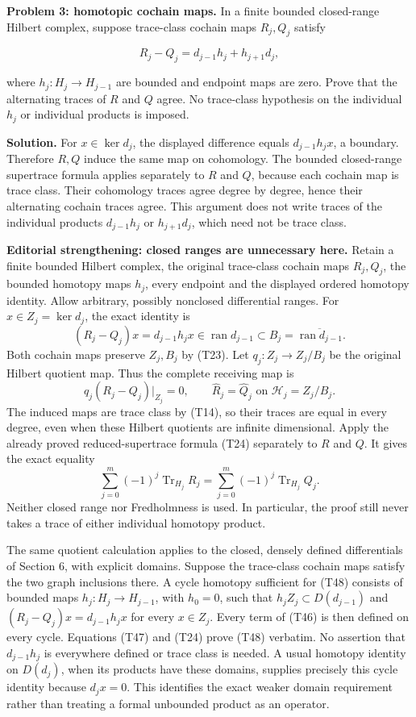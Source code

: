 \documentclass[
  11pt,
]{article}
\begin{document}
\textbf{Problem 3: homotopic cochain maps.} In a finite bounded
closed-range Hilbert complex, suppose trace-class cochain maps
\(R_j,Q_j\) satisfy

\[
R_j-Q_j=d_{j-1}h_j+h_{j+1}d_j,
\]

where \(h_j:H_j\to H_{j-1}\) are bounded and endpoint maps are zero.
Prove that the alternating traces of \(R\) and \(Q\) agree. No
trace-class hypothesis on the individual \(h_j\) or individual products
is imposed.

\textbf{Solution.} For \(x\in\ker d_j\), the displayed difference equals
\(d_{j-1}h_jx\), a boundary. Therefore \(R,Q\) induce the same map on
cohomology. The bounded closed-range supertrace formula applies
separately to \(R\) and \(Q\), because each cochain map is trace class.
Their cohomology traces agree degree by degree, hence their alternating
cochain traces agree. This argument does not write traces of the
individual products \(d_{j-1}h_j\) or \(h_{j+1}d_j\), which need not be
trace class.

\textbf{Editorial strengthening: closed ranges are unnecessary here.}
Retain a finite bounded Hilbert complex, the original trace-class
cochain maps \(R_j,Q_j\), the bounded homotopy maps \(h_j\), every
endpoint and the displayed ordered homotopy identity. Allow arbitrary,
possibly nonclosed differential ranges. For \(x\in Z_j=\ker d_j\), the
exact identity is \[
 (R_j-Q_j)x=d_{j-1}h_jx\in\operatorname{ran}d_{j-1}
                  \subset B_j=\overline{\operatorname{ran}d_{j-1}}.
 \tag{T46}
\] Both cochain maps preserve \(Z_j,B_j\) by (T23). Let
\(q_j:Z_j\to Z_j/B_j\) be the original Hilbert quotient map. Thus the
complete receiving map is \[
 q_j(R_j-Q_j)|_{Z_j}=0,
 \qquad \widehat R_j=\widehat Q_j
       \text{ on }\mathcal H_j=Z_j/B_j.
 \tag{T47}
\] The induced maps are trace class by (T14), so their traces are equal
in every degree, even when these Hilbert quotients are infinite
dimensional. Apply the already proved reduced-supertrace formula (T24)
separately to \(R\) and \(Q\). It gives the exact equality \[
 \sum_{j=0}^m(-1)^j\operatorname{Tr}_{H_j}R_j
 =\sum_{j=0}^m(-1)^j\operatorname{Tr}_{H_j}Q_j.
 \tag{T48}
\] Neither closed range nor Fredholmness is used. In particular, the
proof still never takes a trace of either individual homotopy product.

The same quotient calculation applies to the closed, densely defined
differentials of Section 6, with explicit domains. Suppose the
trace-class cochain maps satisfy the two graph inclusions there. A cycle
homotopy sufficient for (T48) consists of bounded maps
\(h_j:H_j\to H_{j-1}\), with \(h_0=0\), such that
\(h_j Z_j\subset D(d_{j-1})\) and \((R_j-Q_j)x=d_{j-1}h_jx\) for every
\(x\in Z_j\). Every term of (T46) is then defined on every cycle.
Equations (T47) and (T24) prove (T48) verbatim. No assertion that
\(d_{j-1}h_j\) is everywhere defined or trace class is needed. A usual
homotopy identity on \(D(d_j)\), when its products have these domains,
supplies precisely this cycle identity because \(d_jx=0\). This
identifies the exact weaker domain requirement rather than treating a
formal unbounded product as an operator.
\end{document}
